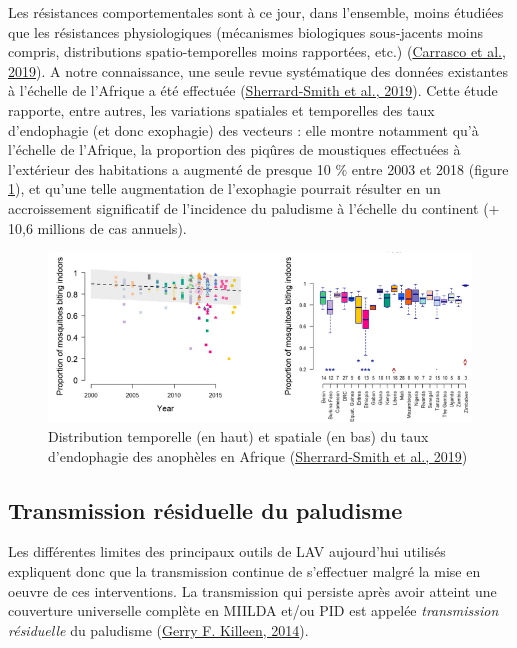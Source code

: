 \documentclass[12pt,twoside]{reedthesis}
\begin{document}
Les résistances comportementales sont à ce jour, dans l'ensemble, moins étudiées que les résistances physiologiques (mécanismes biologiques sous-jacents moins compris, distributions spatio-temporelles moins rapportées, etc.) (\protect\hyperlink{ref-carrasco_behavioural_2019}{Carrasco et al., 2019}). A notre connaissance, une seule revue systématique des données existantes à l'échelle de l'Afrique a été effectuée (\protect\hyperlink{ref-sherrard-smith_mosquito_2019}{Sherrard-Smith et al., 2019}). Cette étude rapporte, entre autres, les variations spatiales et temporelles des taux d'endophagie (et donc exophagie) des vecteurs : elle montre notamment qu'à l'échelle de l'Afrique, la proportion des piqûres de moustiques effectuées à l'extérieur des habitations a augmenté de presque 10 \% entre 2003 et 2018 (figure \ref{fig:dev-res-comp}), et qu'une telle augmentation de l'exophagie pourrait résulter en un accroissement significatif de l'incidence du paludisme à l'échelle du continent (+ 10,6 millions de cas annuels).\\
\begin{figure}

{\centering \includegraphics[width=1\linewidth]{figure/dev_res_comp} 

}

\caption[Distribution spatio-temporelle du taux d'endophagie des anophèles en Afrique]{Distribution temporelle (en haut) et spatiale (en bas) du taux d'endophagie des anophèles en Afrique (\protect\hyperlink{ref-sherrard-smith_mosquito_2019}{Sherrard-Smith et al., 2019})}\label{fig:dev-res-comp}
\end{figure}
\hypertarget{transmission-ruxe9siduelle-du-paludisme}{%
\subsection{Transmission résiduelle du paludisme}\label{transmission-ruxe9siduelle-du-paludisme}}

Les différentes limites des principaux outils de LAV aujourd'hui utilisés expliquent donc que la transmission continue de s'effectuer malgré la mise en oeuvre de ces interventions. La transmission qui persiste après avoir atteint une couverture universelle complète en MIILDA et/ou PID est appelée \emph{transmission résiduelle} du paludisme (\protect\hyperlink{ref-killeen_characterizing_2014}{Gerry F. Killeen, 2014}).\\
\end{document}
